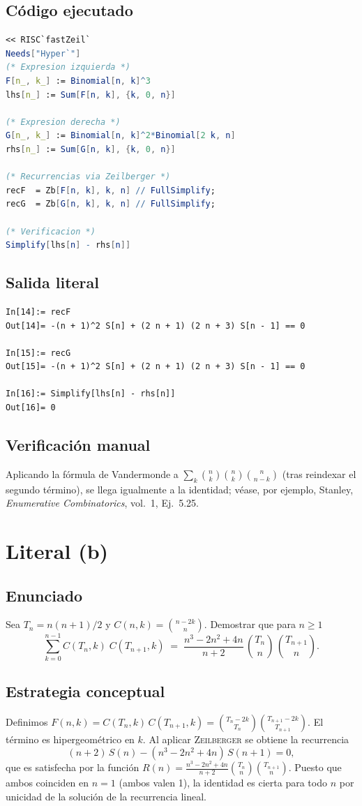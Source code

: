 \documentclass[12pt]{article}
\begin{document}
\subsection*{Código ejecutado}
\begin{lstlisting}[language=Mathematica]
<< RISC`fastZeil`
Needs["Hyper`"]
(* Expresion izquierda *)
F[n_, k_] := Binomial[n, k]^3
lhs[n_] := Sum[F[n, k], {k, 0, n}]

(* Expresion derecha *)
G[n_, k_] := Binomial[n, k]^2*Binomial[2 k, n]
rhs[n_] := Sum[G[n, k], {k, 0, n}]

(* Recurrencias via Zeilberger *)
recF  = Zb[F[n, k], k, n] // FullSimplify;
recG  = Zb[G[n, k], k, n] // FullSimplify;

(* Verificacion *)
Simplify[lhs[n] - rhs[n]]
\end{lstlisting}
\subsection*{Salida literal}
\begin{verbatim}
In[14]:= recF
Out[14]= -(n + 1)^2 S[n] + (2 n + 1) (2 n + 3) S[n - 1] == 0

In[15]:= recG
Out[15]= -(n + 1)^2 S[n] + (2 n + 1) (2 n + 3) S[n - 1] == 0

In[16]:= Simplify[lhs[n] - rhs[n]]
Out[16]= 0
\end{verbatim}

\subsection*{Verificación manual}
Aplicando la fórmula de Vandermonde a
\(\displaystyle\sum_{k}\binom{n}{k}\binom{n}{k}\binom{n}{n-k}\)
(tras reindexar el segundo término),
se llega igualmente a la identidad; véase, por ejemplo, Stanley, \emph{Enumerative Combinatorics}, vol.~1, Ej.~5.25.

\section{Literal (b)}
\subsection*{Enunciado}
Sea \(T_{n}=n(n+1)/2\) y \(C(n,k)=\binom{n-2k}{n}\).
Demostrar que para \(n\ge1\)
\[
  \sum_{k=0}^{n-1}C(T_{n},k)\;C(T_{n+1},k)
  \;=\;
  \frac{n^{3}-2n^{2}+4n}{n+2}\,
  \binom{T_{n}}{n}\,\binom{T_{n+1}}{n}.
\]

\subsection*{Estrategia conceptual}
Definimos
\(
  F(n,k)=C(T_{n},k)\,C(T_{n+1},k)
  =\displaystyle\binom{T_{n}-2k}{T_{n}}\binom{T_{n+1}-2k}{T_{n+1}}.
\)
El término es hipergeométrico en \(k\).
Al aplicar \textsc{Zeilberger} se obtiene la recurrencia
\[
  (n+2)\,S(n) - (n^{3}-2n^{2}+4n)\,S(n+1)=0,
\]
que es satisfecha por la función
\(
  R(n)=\displaystyle\frac{n^{3}-2n^{2}+4n}{n+2}
        \binom{T_{n}}{n}\binom{T_{n+1}}{n}.
\)
Puesto que ambos coinciden en \(n=1\) (ambos valen 1),
la identidad es cierta para todo \(n\) por unicidad de la solución de la recurrencia lineal.
\end{document}
